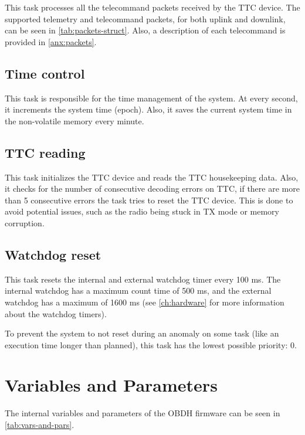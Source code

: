 This task processes all the telecommand packets received by the TTC device. The supported telemetry and telecommand packets, for both uplink and downlink, can be seen in \autoref{tab:packets-struct}. Also, a description of each telecommand is provided in \autoref{anx:packets}.

\subsection{Time control}

This task is responsible for the time management of the system. At every second, it increments the system time (epoch). Also, it saves the current system time in the non-volatile memory every minute.

\subsection{TTC reading}

This task initializes the TTC device and reads the TTC housekeeping data. Also, it checks for the number of consecutive decoding errors on TTC, if there are more than 5 consecutive errors the task tries to reset the TTC device. This is done to avoid potential issues, such as the radio being stuck in TX mode or memory corruption.

\subsection{Watchdog reset}

This task resets the internal and external watchdog timer every 100 ms. The internal watchdog has a maximum count time of 500 ms, and the external watchdog has a maximum of 1600 ms (see \autoref{ch:hardware} for more information about the watchdog timers).

To prevent the system to not reset during an anomaly on some task (like an execution time longer than planned), this task has the lowest possible priority: 0.

\section{Variables and Parameters}

The internal variables and parameters of the OBDH firmware can be seen in \autoref{tab:vars-and-pars}.

